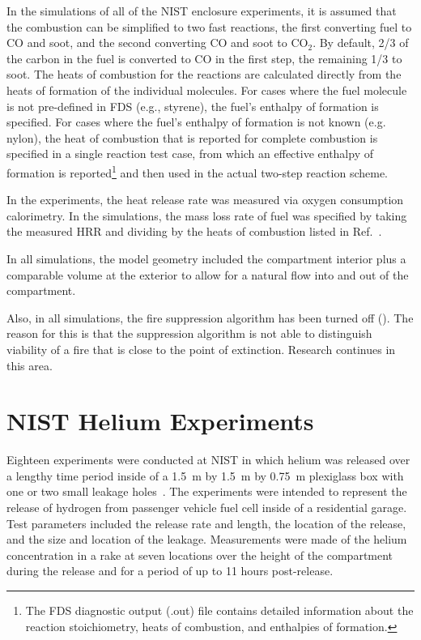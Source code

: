 In the simulations of all of the NIST enclosure experiments, it is assumed that the combustion can be simplified to two fast reactions, the first converting fuel to CO and soot, and the second converting CO and soot to CO$_2$. By default, 2/3 of the carbon in the fuel is converted to CO in the first step, the remaining 1/3 to soot. The heats of combustion for the reactions are calculated directly from the heats of formation of the individual molecules. For cases where the fuel molecule is not pre-defined in FDS (e.g., styrene), the fuel's enthalpy of formation is specified. For cases where the fuel's enthalpy of formation is not known (e.g. nylon), the heat of combustion that is reported for complete combustion is specified in a single reaction test case, from which an effective enthalpy of formation is reported\footnote{The FDS diagnostic output (.out) file contains detailed information about the reaction stoichiometry, heats of combustion, and enthalpies of formation.} and then used in the actual two-step reaction scheme.

In the experiments, the heat release rate was measured via oxygen consumption calorimetry. In the simulations, the mass loss rate of fuel was specified by taking the measured HRR and dividing by the heats of combustion listed in Ref.~\cite{SFPE:Tewarson}.

In all simulations, the model geometry included the compartment interior plus a comparable volume at the exterior to allow for a natural flow into and out of the compartment.

Also, in all simulations, the fire suppression algorithm has been turned off (). The reason for this is that the suppression algorithm is not able to distinguish viability of a fire that is close to the point of extinction. Research continues in this area.


\FloatBarrier


\section{NIST Helium Experiments}
\label{NIST_Helium_Description}

Eighteen experiments were conducted at NIST in which helium was released over a lengthy time period inside of a 1.5~m by 1.5~m by 0.75~m plexiglass box with one or two small leakage holes~\cite{Pitts:2011}. The experiments were intended to represent the release of hydrogen from passenger vehicle fuel cell inside of a residential garage. Test parameters included the release rate and length, the location of the release, and the size and location of the leakage. Measurements were made of the helium concentration in a rake at seven locations over the height of the compartment during the release and for a period of up to 11 hours post-release.

